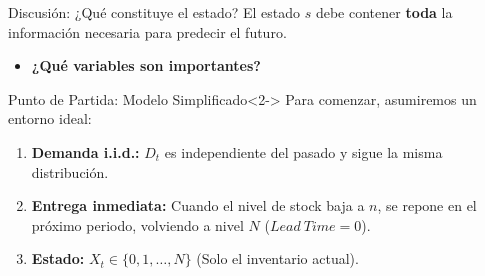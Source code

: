 \documentclass[xcolor=dvipsnames]{beamer}
\begin{document}
\begin{frame}{Discusión: ¿Qué constituye el estado?}
El estado $s$ debe contener \textbf{toda} la información necesaria para predecir el futuro.
\begin{itemize}
    \item \textbf{¿Qu\'e variables son importantes?} 
\end{itemize}

\vspace{0.3cm}


\begin{block}{Punto de Partida: Modelo Simplificado}<2->
    Para comenzar, asumiremos un entorno ideal:
    \begin{enumerate}
        \item \textbf{Demanda i.i.d.:} $D_t$ es independiente del pasado y sigue la misma distribución.
        \item \textbf{Entrega inmediata:} Cuando el nivel de stock baja a $n$,  se repone en el pr\'oximo periodo, volviendo a nivel $N$ ($Lead\ Time = 0$).
        \item \textbf{Estado:} $X_t \in \{0, 1, \dots, N\}$ (Solo el inventario actual).
    \end{enumerate}
\end{block}%
\end{frame}
\end{document}
